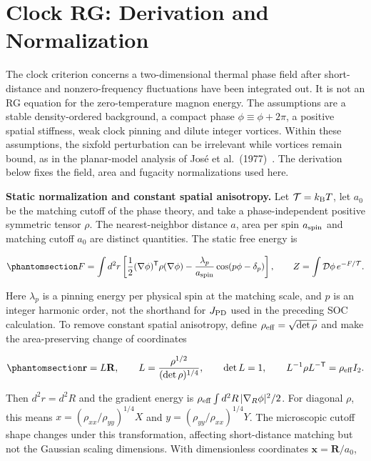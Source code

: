 \clearpage

\section{Clock RG: Derivation and
Normalization}\label{sec-nbcp-clock-rg}

The clock criterion concerns a two-dimensional thermal phase field after
short-distance and nonzero-frequency fluctuations have been integrated
out. It is not an RG equation for the zero-temperature magnon energy.
The assumptions are a stable density-ordered background, a compact phase
\(\phi\equiv\phi+2\pi\), a positive spatial stiffness, weak clock
pinning and dilute integer vortices. Within these assumptions, the
sixfold perturbation can be irrelevant while vortices remain bound, as
in the planar-model analysis of
José et al.~(1977)~\cite{jose1977}. The
derivation below fixes the field, area and fugacity normalizations used
here.

\textbf{Static normalization and constant spatial anisotropy.} Let
\(\mathcal T=k_{\rm B}T\), let \(a_0\) be the matching cutoff of the
phase theory, and take a phase-independent positive symmetric tensor
\(\rho\). The nearest-neighbor distance \(a\), area per spin
\(a_{\rm spin}\) and matching cutoff \(a_0\) are distinct quantities.
The static free energy is

\begin{equation}\phantomsection\label{eq-nbcp-clock-partition}{
F=\int d^2r\left[
\frac12(\nabla\phi)^{\mathsf T}\rho(\nabla\phi)
-\frac{\lambda_p}{a_{\rm spin}}\cos(p\phi-\delta_p)\right],
\qquad Z=\int\mathcal D\phi\,e^{-F/\mathcal T}.
}\end{equation}

Here \(\lambda_p\) is a pinning energy per physical spin at the matching
scale, and \(p\) is an integer harmonic order, not the shorthand for
\(J_{\rm PD}\) used in the preceding SOC calculation. To remove constant
spatial anisotropy, define \(\rho_{\rm eff}=\sqrt{\det\rho}\) and make
the area-preserving change of coordinates

\begin{equation}\phantomsection\label{eq-nbcp-clock-anisotropy-map}{
\mathbf r=L\mathbf R,\qquad
L=\frac{\rho^{1/2}}{(\det\rho)^{1/4}},\qquad
\det L=1,\qquad L^{-1}\rho L^{-\mathsf T}=\rho_{\rm eff}I_2.
}\end{equation}

Then \(d^2r=d^2R\) and the gradient energy is
\(\rho_{\rm eff}\int d^2R\,|\nabla_R\phi|^2/2\). For diagonal \(\rho\),
this means \(x=(\rho_{xx}/\rho_{yy})^{1/4}X\) and
\(y=(\rho_{yy}/\rho_{xx})^{1/4}Y\). The microscopic cutoff shape changes
under this transformation, affecting short-distance matching but not the
Gaussian scaling dimensions. With dimensionless coordinates
\(\mathbf x=\mathbf R/a_0\),

